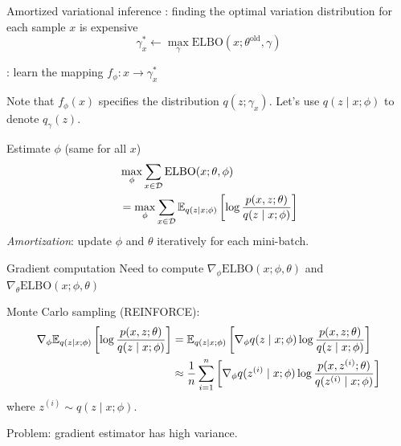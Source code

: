 \documentclass[usenames,dvipsnames,notes]{beamer}
\begin{document}
\begin{frame}
    {Amortized variational inference}
    : finding the optimal variation distribution for each sample $x$ is expensive
            $$\gamma^*_x \leftarrow \max_\gamma \text{ELBO}(x;\theta^{\text{old}}, \gamma)$$ 

    : learn the mapping $f_\phi\colon x \rightarrow \gamma^*_x$ 

    Note that $f_\phi(x)$ specifies the distribution $q(z;\gamma_x)$.
    Let's use $q(z\mid x;\phi)$ to denote $q_\gamma(z)$.

    Estimate $\phi$ (same for all $x$)
    \begin{align*}
        & \max_\phi \sum_{x\in\mathcal{D}}\text{ELBO}(x;\theta, \phi)\\
        &= \max_\phi \sum_{x\in\mathcal{D}} \mathbb{E}_{q(z\mid x; \phi)} \left[ \log \frac{p(x,z;\theta)}{q(z\mid x;\phi)} \right]
    \end{align*}
    \emph{Amortization}: update $\phi$ and $\theta$ iteratively for each mini-batch.
\end{frame}

\begin{frame}
    {Gradient computation}
    Need to compute $\nabla_\phi \text{ELBO}(x;\phi,\theta)$ and $\nabla_\theta \text{ELBO}(x;\phi,\theta)$

    Monte Carlo sampling (REINFORCE):
    \begin{align*}
    \nabla_\phi \mathbb{E}_{q(z\mid x; \phi)} \left[ \log \frac{p(x,z;\theta)}{q(z\mid x;\phi)} \right]
        &= \mathbb{E}_{q(z\mid x; \phi)} \left[ \nabla_\phi q(z\mid x; \phi)  \log \frac{p(x,z;\theta)}{q(z\mid x;\phi)} \right] \\
        &\approx \frac{1}{n}\sum_{i=1}^n \left[ \nabla_\phi q(z^{(i)}\mid x; \phi)  \log \frac{p(x,z^{(i)};\theta)}{q(z^{(i)}\mid x;\phi)} \right]
    \end{align*}
    where $z^{(i)}\sim q(z\mid x; \phi)$.

    Problem: gradient estimator has \alert{high variance}.
\end{frame}
\end{document}
